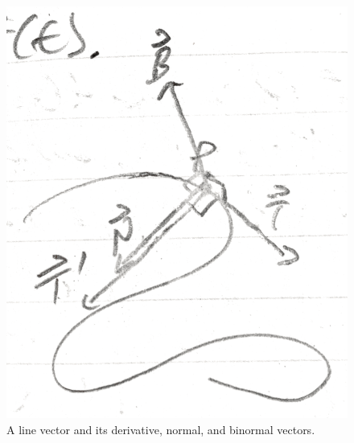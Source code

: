 \documentclass{article}[11pt]
\begin{document}
\begin{figure}[h]
    \includegraphics[width=\textwidth]{img5.PNG}
    \caption{A line vector and its derivative, normal, and binormal vectors.}
\end{figure}
\end{document}
